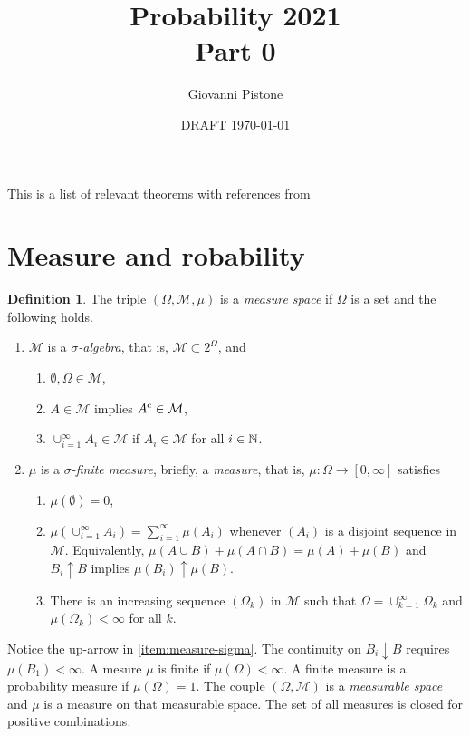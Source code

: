 \documentclass[12pt,a4paper]{amsart}
\title{Probability 2021 \\ Part 0
}
\author[G. Pistone]{Giovanni Pistone}
\date{DRAFT \today}
\theoremstyle{plain}%
\theoremstyle{definition}
\newtheorem{definition}{Definition}%
\theoremstyle{remark}
\begin{document}
\maketitle
\tableofcontents

This is a list of relevant theorems with references from \cite{rudin:1987-3rd}

\section{Measure and robability}
\label{sec:probability}

\begin{definition}
The triple $(\Omega,\mathcal M,\mu)$ is a \emph{measure space} if
$\Omega$ is a set and the following holds.
\begin{enumerate}
\item $\mathcal M$ is a \emph{$\sigma$-algebra}, that is, $\mathcal M
  \subset 2^\Omega$, and
  \begin{enumerate}
  \item $\emptyset, \Omega \in \mathcal M$,
  \item $A \in \mathcal M$ implies $A^{\text c} \in \mathcal M$,
  \item $\cup_{i=1}^{\infty} A_i \in \mathcal M$ if $A_i \in \mathcal
    M$ for all $i \in \mathbb{N}$.
  \end{enumerate}
  \item $\mu$ is a \emph{$\sigma$-finite measure}, briefly, a
    \emph{measure}, that is, $\mu \colon \Omega \to [0,\infty]$ satisfies
  \begin{enumerate} 
  \item $\mu(\emptyset) = 0$,
  \item \label{item:measure-sigma}
    $\mu\left(\cup_{i=1 }^\infty A_i\right) = \sum_{i=1}^\infty
    \mu(A_i)$ whenever $(A_i)$ is a disjoint sequence in $\mathcal
    M$. Equivalently,
    $\mu(A \cup B) + \mu(A \cap B) = \mu(A) + \mu(B)$ and
    $B_i \uparrow B$ implies $\mu(B_i) \uparrow \mu(B)$.
  \item There is an increasing sequence $(\Omega_k)$ in $\mathcal M$
    such that $\Omega = \cup_{k=1}^\infty \Omega_k$ and
    $\mu(\Omega_k) < \infty$ for all $k$.
  \end{enumerate}
\end{enumerate}
\end{definition}
Notice the up-arrow in \cref{item:measure-sigma}. The continuity on
$B_i \downarrow B$ requires $\mu(B_1) < \infty$.  A mesure $\mu$ is
finite if $\mu(\Omega) < \infty$. A finite measure is a probability
measure if $\mu(\Omega) =1$. The couple $(\Omega,\mathcal M)$ is a
\emph{measurable space} and $\mu$ is a measure on that measurable
space. The set of all measures is closed for positive combinations.
\end{document}
